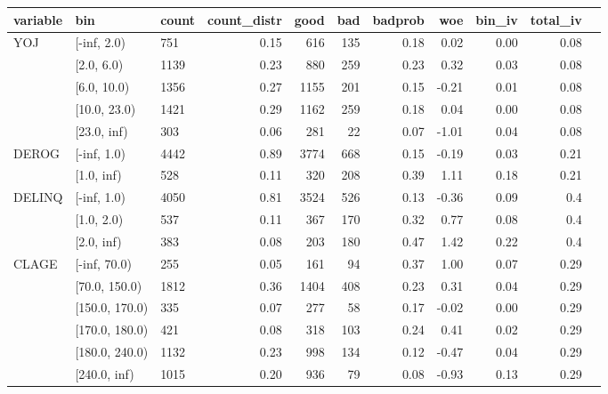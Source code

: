 \begin{landscape}
	\begin{table}[!ht]
		\centering
		\begin{tabular}{lllrrrrrrrr}
			\toprule
			variable & bin &  count &  count\_distr &  good &  bad &   badprob &       woe &    bin\_iv &  total\_iv \\
			\midrule
			      YOJ &   [-inf, 2.0) &    751 &         0.15 &   616 &  135 &     0.18 &  0.02 &    0.00 &      0.08 \\
      &    [2.0, 6.0) &   1139 &         0.23 &   880 &  259 &     0.23 &  0.32 &    0.03 &      0.08 \\
      &   [6.0, 10.0) &   1356 &         0.27 &  1155 &  201 &     0.15 & -0.21 &    0.01 &      0.08 \\
      &  [10.0, 23.0) &   1421 &         0.29 &  1162 &  259 &     0.18 &  0.04 &    0.00 &      0.08 \\
      &   [23.0, inf) &    303 &         0.06 &   281 &   22 &     0.07 & -1.01 &    0.04 &      0.08 \\
			\midrule
			   DEROG &  [-inf, 1.0) &   4442 &         0.89 &  3774 &  668 &     0.15 & -0.19 &    0.03 &      0.21 \\
    &   [1.0, inf) &    528 &         0.11 &   320 &  208 &     0.39 &  1.11 &    0.18 &      0.21 \\
			\midrule
			  DELINQ &  [-inf, 1.0) &   4050 &         0.81 &  3524 &  526 &     0.13 & -0.36 &    0.09 &       0.4 \\
	   &   [1.0, 2.0) &    537 &         0.11 &   367 &  170 &     0.32 &  0.77 &    0.08 &       0.4 \\
	   &   [2.0, inf) &    383 &         0.08 &   203 &  180 &     0.47 &  1.42 &    0.22 &       0.4 \\
			\midrule
			   CLAGE &    [-inf, 70.0) &    255 &         0.05 &   161 &   94 &     0.37 &  1.00 &    0.07 &      0.29 \\
	    &   [70.0, 150.0) &   1812 &         0.36 &  1404 &  408 &     0.23 &  0.31 &    0.04 &      0.29 \\
	    &  [150.0, 170.0) &    335 &         0.07 &   277 &   58 &     0.17 & -0.02 &    0.00 &      0.29 \\
	    &  [170.0, 180.0) &    421 &         0.08 &   318 &  103 &     0.24 &  0.41 &    0.02 &      0.29 \\
	    &  [180.0, 240.0) &   1132 &         0.23 &   998 &  134 &     0.12 & -0.47 &    0.04 &      0.29 \\
	    &    [240.0, inf) &   1015 &         0.20 &   936 &   79 &     0.08 & -0.93 &    0.13 &      0.29 \\

\end{tabular}
\end{table}
\end{landscape}
